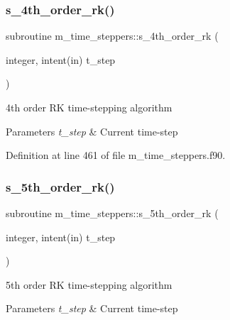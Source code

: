 \mbox{\label{namespacem__time__steppers_ac53b0d079d514df2bf662bc0e042c8db}} 
\subsubsection{\texorpdfstring{s\+\_\+4th\+\_\+order\+\_\+rk()}{s\_4th\_order\_rk()}}
{\footnotesize\ttfamily subroutine m\+\_\+time\+\_\+steppers\+::s\+\_\+4th\+\_\+order\+\_\+rk (\begin{DoxyParamCaption}\item[{integer, intent(in)}]{t\+\_\+step }\end{DoxyParamCaption})}



4th order RK time-\/stepping algorithm 


\begin{DoxyParams}{Parameters}
{\em t\+\_\+step} & Current time-\/step \\
\hline
\end{DoxyParams}


Definition at line 461 of file m\+\_\+time\+\_\+steppers.\+f90.

\mbox{\label{namespacem__time__steppers_a4920633ffe7f703c3827b956b21b7417}} 
\subsubsection{\texorpdfstring{s\+\_\+5th\+\_\+order\+\_\+rk()}{s\_5th\_order\_rk()}}
{\footnotesize\ttfamily subroutine m\+\_\+time\+\_\+steppers\+::s\+\_\+5th\+\_\+order\+\_\+rk (\begin{DoxyParamCaption}\item[{integer, intent(in)}]{t\+\_\+step }\end{DoxyParamCaption})}



5th order RK time-\/stepping algorithm 


\begin{DoxyParams}{Parameters}
{\em t\+\_\+step} & Current time-\/step \\
\hline
\end{DoxyParams}



